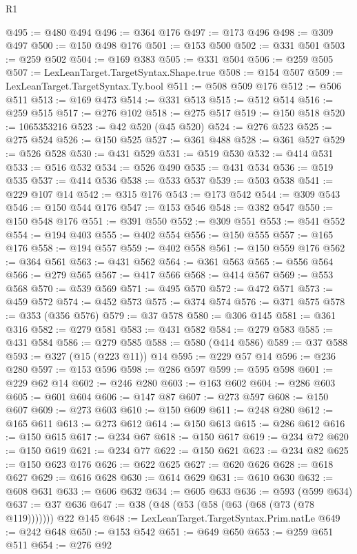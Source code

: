 \begin{lexlean}{R1}
\begin{coremodule}
@495 := @480 @494
@496 := @364 @176
@497 := @173 @496
@498 := @309 @497
@500 := @150 @498 @176
@501 := @153 @500
@502 := @331 @501
@503 := @259 @502
@504 := @169 @383
@505 := @331 @504
@506 := @259 @505
@507 := LexLeanTarget.TargetSyntax.Shape.true
@508 := @154 @507
@509 := LexLeanTarget.TargetSyntax.Ty.bool
@511 := @508 @509 @176
@512 := @506 @511
@513 := @169 @473
@514 := @331 @513
@515 := @512 @514
@516 := @259 @515
@517 := @276 @102
@518 := @275 @517
@519 := @150 @518
@520 := 1065353216
@523 := @42 @520 (@45 @520)
@524 := @276 @523
@525 := @275 @524
@526 := @150 @525
@527 := @361 @488
@528 := @361 @527
@529 := @526 @528
@530 := @431 @529
@531 := @519 @530
@532 := @414 @531
@533 := @516 @532
@534 := @526 @490
@535 := @431 @534
@536 := @519 @535
@537 := @414 @536
@538 := @533 @537
@539 := @503 @538
@541 := @229 @107 @14
@542 := @315 @176
@543 := @173 @542
@544 := @309 @543
@546 := @150 @544 @176
@547 := @153 @546
@548 := @382 @547
@550 := @150 @548 @176
@551 := @391 @550
@552 := @309 @551
@553 := @541 @552
@554 := @194 @403
@555 := @402 @554
@556 := @150 @555
@557 := @165 @176
@558 := @194 @557
@559 := @402 @558
@561 := @150 @559 @176
@562 := @364 @561
@563 := @431 @562
@564 := @361 @563
@565 := @556 @564
@566 := @279 @565
@567 := @417 @566
@568 := @414 @567
@569 := @553 @568
@570 := @539 @569
@571 := @495 @570
@572 := @472 @571
@573 := @459 @572
@574 := @452 @573
@575 := @374 @574
@576 := @371 @575
@578 := @353 (@356 @576)
@579 := @37 @578
@580 := @306 @145
@581 := @361 @316
@582 := @279 @581
@583 := @431 @582
@584 := @279 @583
@585 := @431 @584
@586 := @279 @585
@588 := @580 (@414 @586)
@589 := @37 @588
@593 := @327 (@15 (@223 @11)) @14
@595 := @229 @57 @14
@596 := @236 @280
@597 := @153 @596
@598 := @286 @597
@599 := @595 @598
@601 := @229 @62 @14
@602 := @246 @280
@603 := @163 @602
@604 := @286 @603
@605 := @601 @604
@606 := @147 @87
@607 := @273 @597
@608 := @150 @607
@609 := @273 @603
@610 := @150 @609
@611 := @248 @280
@612 := @165 @611
@613 := @273 @612
@614 := @150 @613
@615 := @286 @612
@616 := @150 @615
@617 := @234 @67
@618 := @150 @617
@619 := @234 @72
@620 := @150 @619
@621 := @234 @77
@622 := @150 @621
@623 := @234 @82
@625 := @150 @623 @176
@626 := @622 @625
@627 := @620 @626
@628 := @618 @627
@629 := @616 @628
@630 := @614 @629
@631 := @610 @630
@632 := @608 @631
@633 := @606 @632
@634 := @605 @633
@636 := @593 (@599 @634)
@637 := @37 @636
@647 := @38 (@48 (@53 (@58 (@63 (@68 (@73 (@78 @119))))))) @22 @145
@648 := LexLeanTarget.TargetSyntax.Prim.natLe
@649 := @242 @648
@650 := @153 @542
@651 := @649 @650
@653 := @259 @651 @511
@654 := @276 @92

\end{coremodule}
\end{lexlean}
